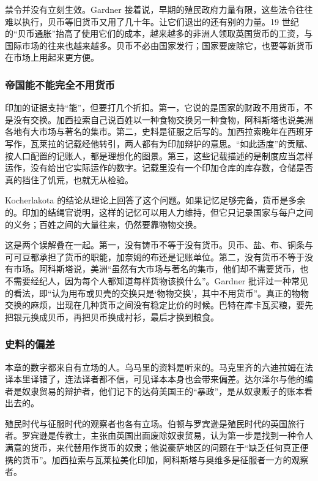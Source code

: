 禁令并没有立刻生效。Gardner 接着说，早期的殖民政府力量有限，这些法令往往难以执行，贝币等旧货币又用了几十年。让它们退出的还有别的力量。19 世纪的“贝币通胀”抬高了使用它们的成本，越来越多的非洲人领取英国货币的工资，与国际市场的往来也越来越多\cite{gardner2015}。贝币不必由国家发行；国家要废除它，也要等新货币在市场上用起来更方便。

\subsubsection{帝国能不能完全不用货币}
印加的证据支持“能”，但要打几个折扣。第一，它说的是国家的财政不用货币，不是没有交换。加西拉索自己说百姓以一种食物交换另一种食物，阿科斯塔也说美洲各地有大市场与著名的集市。第二，史料是征服之后写的。加西拉索晚年在西班牙写作，瓦莱拉的记载经他转引，两人都有为印加辩护的意思。“如此适度”的贡赋、按人口配置的记账人，都是理想化的图景。第三，这些记载描述的是制度应当怎样运作，没有给出它实际运作的数字。记载里没有一个印加仓库的库存数，仓储是否真的挡住了饥荒，也就无从检验。

Kocherlakota 的结论从理论上回答了这个问题。如果记忆足够完备，货币是多余的。印加的结绳官说明，这样的记忆可以用人力维持，但它只记录国家与每户之间的义务；百姓之间的大量往来，仍然要靠物物交换。

\begin{pitfall}
这是两个误解叠在一起。第一，没有铸币不等于没有货币。贝币、盐、布、铜条与可可豆都承担了货币的职能，加奈姆的布还是记账单位。第二，没有货币不等于没有市场。阿科斯塔说，美洲“虽然有大市场与著名的集市，他们却不需要货币，也不需要经纪人，因为每个人都知道每样货物该换什么”\cite{acosta1880}。Gardner 批评过一种常见的看法，即“认为用布或贝壳的交换只是‘物物交换’，其中不用货币”\cite{gardner2015}。真正的物物交换的麻烦，出现在几种货币之间没有稳定比价的时候。巴特在库卡瓦买粮，要先把银元换成贝币，再把贝币换成衬衫，最后才换到粮食。
\end{pitfall}

\subsubsection{史料的偏差}
本章的数字都来自有立场的人。乌马里的资料是听来的。马克里齐的六迪拉姆在法译本里译错了，连法译者都不信，可见译本本身也会带来偏差。达尔泽尔与他的编者是奴隶贸易的辩护者，他们记下的达荷美国王的“暴政”，是从奴隶贩子的账本看出去的。

殖民时代与征服时代的观察者也各有立场。伯顿与罗宾逊是殖民时代的英国旅行者。罗宾逊是传教士，主张由英国出面废除奴隶贸易，认为第一步是找到一种令人满意的货币，来代替用作货币的奴隶；他说豪萨地区的问题在于“缺乏任何真正便携的货币”\cite{robinson1896}。加西拉索与瓦莱拉美化印加，阿科斯塔与奥维多是征服者一方的观察者。

